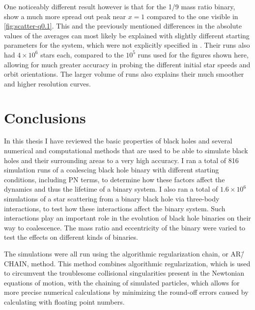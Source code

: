 \documentclass[english, oneside]{HYgradu}
\begin{document}
One noticeably different result however is that for the 1/9 mass ratio binary, \citeauthor{sesana:2006} show a much more spread out peak near $x=1$ compared to the one visible in \ref{fig:scatter-q0.1}. This and the previously mentioned differences in the absolute values of the averages can most likely be explained with slightly different starting parameters for the system, which were not explicitly specified in \citeauthor{sesana:2006}. Their runs also had $4 \times 10^6$ stars each, compared to the $10^5$ runs used for the figures shown here, allowing for much greater accuracy in probing the different initial star speeds and orbit orientations. The larger volume of runs also explains their much smoother and higher resolution curves.


\chapter{Conclusions}

In this thesis I have reviewed the basic properties of black holes and several numerical and computational methods that are used to be able to simulate black holes and their surrounding areas to a very high accuracy. I ran a total of 816 simulation runs of a coalescing black hole binary with different starting conditions, including PN terms, to determine how these factors affect the dynamics and thus the lifetime of a binary system. I also ran a total of $1.6 \times 10^6$ simulations of a star scattering from a binary black hole via three-body interactions, to test how these interactions affect the binary system. Such interactions play an important role in the evolution of black hole binaries on their way to coalescence. The mass ratio and eccentricity of the binary were varied to test the effects on different kinds of binaries.

The simulations were all run using the algorithmic regularization chain, or AR\=/CHAIN, method. This method combines algorithmic regularization, which is used to circumvent the troublesome collisional singularities present in the Newtonian equations of motion, with the chaining of simulated particles, which allows for more precise numerical calculations by minimizing the round-off errors caused by calculating with floating point numbers.
\end{document}
